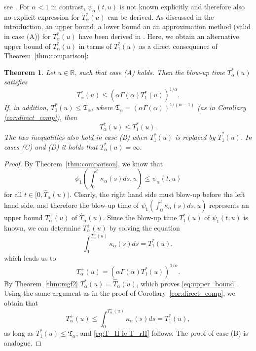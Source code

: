 \documentclass[12pt,a4paper]{amsart}
\numberwithin{equation}{section}
\numberwithin{equation}{section}
\newtheorem{theorem}{Theorem}[section]
\theoremstyle{nonumberplain}
\newcommand{\RR}{\mathbb{R}}
\begin{document}
see \cite{andersen2007moment, keller-ressel2011moment}. For $\alpha < 1$ in contrast, $\psi_\alpha(t,u)$ is not known explicitly and therefore also no explicit expression for $T_\alpha^*(u)$ can be derived. As discussed in the introduction, an upper bound, a lower bound an an approximation method (valid in case (A)) for $T_\alpha^*(u)$ have been derived in \cite{gerhold2018moment}. Here, we obtain an alternative upper bound of $T_{\alpha}^*(u)$ in terms of $T_1^*(u)$ as a direct consequence of Theorem~\ref{thm:comparison}:
\begin{theorem}\label{thm:heston_upper_bound}
	Let $u \in \RR$, such that case (A) holds. Then the blow-up time $T_{\alpha}^*(u)$ satisfies
	\begin{equation}\label{eq:upper_bound}
		T_{\alpha}^*(u) \le \left(\alpha \Gamma(\alpha) T_1^*(u) \right)^{1/\alpha}.
	\end{equation}
	 If, in addition, $T_1^*(u) \le \mathfrak{T}_\alpha$, where $\mathfrak{T}_\alpha = (\alpha \Gamma(\alpha))^{1/(\alpha -1)}$ (as in Corollary \ref{cor:direct_comp}), then
	  \begin{equation}\label{eq:T_H le T_rH}
	  	T_{\alpha}^*(u) \le T_1^*(u).
	  \end{equation}
	  The two inequalities also hold in case (B) when $T_1^*(u)$ is replaced by $ \overline T_1^*(u)$. In cases (C) and (D) it holds that $T_\alpha^*(u) = \infty$.
\end{theorem}
\begin{proof} By Theorem~\ref{thm:comparison}, we know that 
\[\psi_1\left(\int_0^t \kappa_\alpha(s) ds, u \right) \le \psi_\alpha(t,u)\]
for all $t \in [0,\hat T_\alpha(u))$. Clearly, the right hand side must blow-up before the left hand side, and therefore the blow-up time of $\psi_1(\int_0^t \kappa_{\alpha}(s) ds,u)$ represents an upper bound $T_\alpha^+(u)$ of $\hat T_\alpha(u)$. Since the blow-up time $T_1^*(u)$ of $\psi_1(t,u)$ is known,  we can determine $T_\alpha^+(u)$ by solving the equation
	\begin{equation*}
		\int_0^{T_\alpha^+(u)} \kappa_{\alpha}(s) ds = T_1^*(u),
	\end{equation*}
	which leads us to
	\begin{equation*}
		T_\alpha^+(u) = (\alpha \Gamma(\alpha)T_1^*(u))^{1/\alpha}.
	\end{equation*}
By Theorem~\ref{thm:mgf2} $T_{\alpha}^*(u) = \hat{T}_{\alpha}(u)$, which proves \eqref{eq:upper_bound}. Using the same argument as in the proof of Corollary~\ref{cor:direct_comp}, we obtain that 
	\begin{equation*}
		T_\alpha^+(u) \le \int_0^{T_\alpha^+(u)} \kappa_{\alpha}(s) ds = T_1^*(u),
	\end{equation*}
	as long as $T_1^*(u) \le \mathfrak{T}_\alpha$, and \eqref{eq:T_H le T_rH} follows. The proof of case (B) is analogue.
\end{proof}
	
\end{document}
